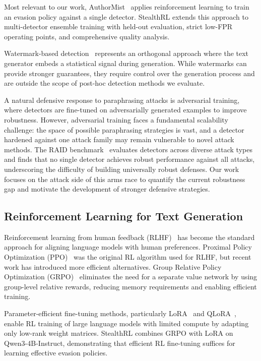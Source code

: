 \documentclass[11pt]{article}
\begin{document}
Most relevant to our work, AuthorMist~\cite{david2025authormistevadingaitext} applies reinforcement learning to train an evasion policy against a single detector. StealthRL extends this approach to multi-detector ensemble training with held-out evaluation, strict low-FPR operating points, and comprehensive quality analysis.

Watermark-based detection~\cite{kirchenbauer2023watermark} represents an orthogonal approach where the text generator embeds a statistical signal during generation. While watermarks can provide stronger guarantees, they require control over the generation process and are outside the scope of post-hoc detection methods we evaluate.

A natural defensive response to paraphrasing attacks is adversarial training, where detectors are fine-tuned on adversarially generated examples to improve robustness. However, adversarial training faces a fundamental scalability challenge: the space of possible paraphrasing strategies is vast, and a detector hardened against one attack family may remain vulnerable to novel attack methods. The RAID benchmark~\cite{dugan2024raidsharedbenchmarkrobust} evaluates detectors across diverse attack types and finds that no single detector achieves robust performance against all attacks, underscoring the difficulty of building universally robust defenses. Our work focuses on the attack side of this arms race to quantify the current robustness gap and motivate the development of stronger defensive strategies.

\subsection{Reinforcement Learning for Text Generation}

Reinforcement learning from human feedback (RLHF)~\cite{ouyang2022training} has become the standard approach for aligning language models with human preferences. Proximal Policy Optimization (PPO)~\cite{schulman2017ppo} was the original RL algorithm used for RLHF, but recent work has introduced more efficient alternatives. Group Relative Policy Optimization (GRPO)~\cite{pang2025grpo,shao2024deepseekmath} eliminates the need for a separate value network by using group-level relative rewards, reducing memory requirements and enabling efficient training.

Parameter-efficient fine-tuning methods, particularly LoRA~\cite{hu2021loralowrankadaptationlarge} and QLoRA~\cite{dettmers2023qlora}, enable RL training of large language models with limited compute by adapting only low-rank weight matrices. StealthRL combines GRPO with LoRA on Qwen3-4B-Instruct, demonstrating that efficient RL fine-tuning suffices for learning effective evasion policies.
\end{document}
